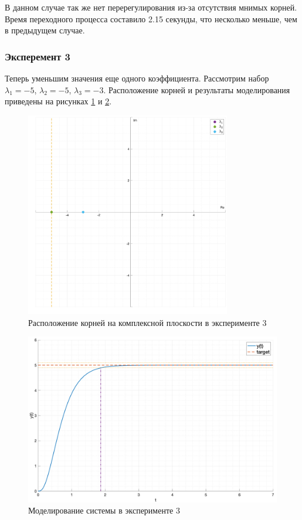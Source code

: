 В данном случае так же нет перерегулирования из-за отсутствия мнимых корней.
Время переходного процесса составило 2.15 секунды, что несколько меньше, чем в предыдущем случае.

\subsubsection{Эксперемент 3}
\label{task2_case3}
Теперь уменьшим значения еще одного коэффициента. Рассмотрим набор 
$\lambda_1 = -5$, $\lambda_2 = -5$, $\lambda_3 = -3$. Расположение корней
и результаты моделирования приведены на рисунках \ref{fig:task_2_points3} и
\ref{fig:task_2_case3}.

\begin{figure}
    \centering
    \includegraphics[width=0.8\textwidth]{media/plots/task2_points3.png}
    \caption{Расположение корней на комплексной плоскости в эксперименте 3}
    \label{fig:task_2_points3}
\end{figure}

\begin{figure}
    \centering
    \includegraphics[width=\textwidth]{media/plots/task2_case3.png}
    \caption{Моделирование системы в эксперименте 3}
    \label{fig:task_2_case3}
\end{figure}

